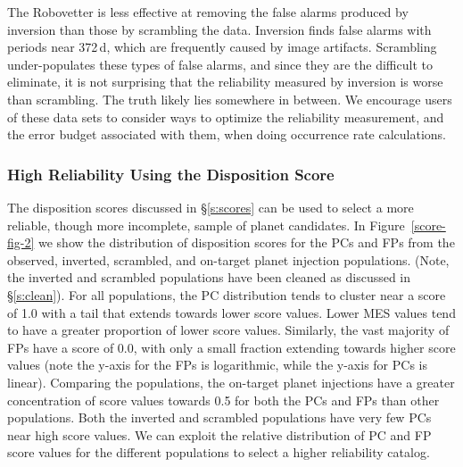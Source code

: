 The Robovetter is less effective at removing the false alarms produced by inversion than those by scrambling the data. Inversion finds false alarms with periods near 372\,d, which are frequently caused by image artifacts.  Scrambling under-populates these types of false alarms, and since they are the difficult to eliminate, it is not surprising that the reliability measured by inversion is worse than scrambling.  The truth likely lies somewhere in between. We encourage users of these data sets to consider ways to optimize the reliability measurement, and the error budget associated with them, when doing occurrence rate calculations. 




\subsubsection{High Reliability Using the Disposition Score}
\label{s:crscores}

The disposition scores discussed in \S\ref{s:scores} can be used to select a more reliable, though more incomplete, sample of planet candidates. In Figure~\ref{score-fig-2} we show the distribution of disposition scores for the PCs and FPs from the observed, inverted, scrambled, and on-target planet injection populations. (Note, the inverted and scrambled populations have been cleaned as discussed in \S\ref{s:clean}). For all populations, the PC distribution tends to cluster near a score of 1.0 with a tail that extends towards lower score values. Lower MES values tend to have a greater proportion of lower score values. Similarly, the vast majority of FPs have a score of 0.0, with only a small fraction extending towards higher score values (note the y-axis for the FPs is logarithmic, while the y-axis for PCs is linear). Comparing the populations, the on-target planet injections have a greater concentration of score values towards 0.5 for both the PCs and FPs than other populations. Both the inverted and scrambled populations have very few PCs near high score values. We can exploit the relative distribution of PC and FP score values for the different populations to select a higher reliability catalog.

